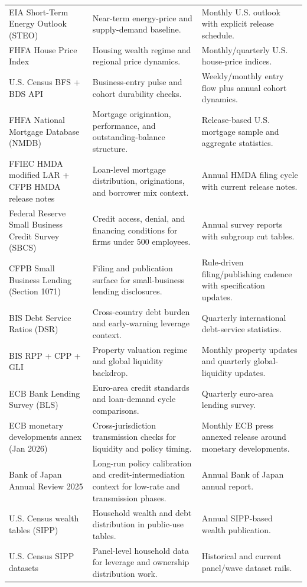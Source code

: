 \documentclass[11pt,openany]{book}
\begin{document}
\begin{longtable}{>{\raggedright\arraybackslash}p{}p{}p{}}
EIA Short-Term Energy Outlook (STEO) & Near-term energy-price and supply-demand baseline. & Monthly U.S. outlook with explicit release schedule. \\
FHFA House Price Index & Housing wealth regime and regional price dynamics. & Monthly/quarterly U.S. house-price indices. \\
U.S. Census BFS + BDS API & Business-entry pulse and cohort durability checks. & Weekly/monthly entry flow plus annual cohort dynamics. \\
FHFA National Mortgage Database (NMDB) & Mortgage origination, performance, and outstanding-balance structure. & Release-based U.S. mortgage sample and aggregate statistics. \\
FFIEC HMDA modified LAR + CFPB HMDA release notes & Loan-level mortgage distribution, originations, and borrower mix context. & Annual HMDA filing cycle with current release notes. \\
Federal Reserve Small Business Credit Survey (SBCS) & Credit access, denial, and financing conditions for firms under 500 employees. & Annual survey reports with subgroup cut tables. \\
CFPB Small Business Lending (Section 1071) & Filing and publication surface for small-business lending disclosures. & Rule-driven filing/publishing cadence with specification updates. \\
BIS Debt Service Ratios (DSR) & Cross-country debt burden and early-warning leverage context. & Quarterly international debt-service statistics. \\
BIS RPP + CPP + GLI & Property valuation regime and global liquidity backdrop. & Monthly property updates and quarterly global-liquidity updates. \\
ECB Bank Lending Survey (BLS) & Euro-area credit standards and loan-demand cycle comparisons. & Quarterly euro-area lending survey. \\
ECB monetary developments annex (Jan 2026) & Cross-jurisdiction transmission checks for liquidity and policy timing. & Monthly ECB press annexed release around monetary developments. \\
Bank of Japan Annual Review 2025 & Long-run policy calibration and credit-intermediation context for low-rate and transmission phases. & Annual Bank of Japan annual report. \\
U.S. Census wealth tables (SIPP) & Household wealth and debt distribution in public-use tables. & Annual SIPP-based wealth publication. \\
U.S. Census SIPP datasets & Panel-level household data for leverage and ownership distribution work. & Historical and current panel/wave dataset rails. \\

\end{longtable}
\end{document}
